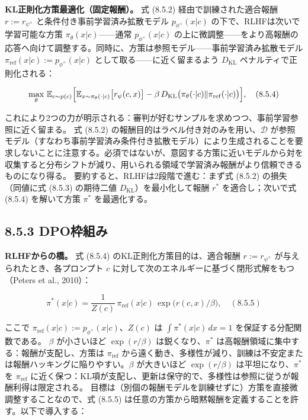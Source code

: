 \textbf{KL正則化方策最適化（固定報酬）。} 式 (8.5.2) 経由で訓練された適合報酬 $r:=r_{\psi^\times}$ と条件付き事前学習済み拡散モデル $p_{\phi^\times}(x|c)$ の下で、RLHFは次いで学習可能な方策 $\pi_\theta(x|c)$——通常 $p_{\phi^\times}(x|c)$ の上に微調整——をより高報酬の応答へ向けて調整する。同時に、方策は参照モデル——事前学習済み拡散モデル $\pi_{\mathrm{ref}}(x|c):=p_{\phi^\times}(x|c)$ として取る——に近く留まるよう $D_{\mathrm{KL}}$ ペナルティで正則化される：

\[
\max_\theta\,\mathbb{E}_{c\sim p(c)}\Bigl[\mathbb{E}_{x\sim\pi_\theta(\cdot|c)}\bigl[r_\psi(c,x)\bigr]-\beta\,D_{\mathrm{KL}}\bigl(\pi_\theta(\cdot|c)\|\pi_{\mathrm{ref}}(\cdot|c)\bigr)\Bigr], \quad (8.5.4)
\]


これにより2つの力が明示される：審判が好むサンプルを求めつつ、事前学習参照に近く留まる。
式 (8.5.2) の報酬目的はラベル付き対のみを用い、$\mathcal{D}$ が参照モデル（すなわち事前学習済み条件付き拡散モデル）により生成されることを要求しないことに注意する。必須ではないが、意図する方策に近いモデルから対を収集すると分布シフトが減り、用いられる領域で学習済み報酬がより信頼できるものになり得る。
要約すると、RLHFは2段階で進む：まず式 (8.5.2) の損失（同値に式 (8.5.3) の期待二値 $D_{\mathrm{KL}}$）を最小化して報酬 $r^*$ を適合し；次いで式 (8.5.4) を解いて方策 $\pi^*$ を最適化する。

\subsection*{8.5.3 DPO枠組み}


\textbf{RLHFからの橋。} 式 (8.5.4) のKL正則化方策目的は、適合報酬 $r:=r_{\psi^\times}$ が与えられたとき、各プロンプト $c$ に対して次のエネルギーに基づく閉形式解をもつ（Peters et al., 2010）：

\[
\pi^*(x|c)=\frac{1}{Z(c)}\,\pi_{\mathrm{ref}}(x|c)\,\exp\bigl(r(c,x)/\beta\bigr), \quad (8.5.5)
\]


ここで $\pi_{\mathrm{ref}}(x|c):=p_{\phi^\times}(x|c)$、$Z(c)$ は $\int\pi^*(x|c)\,dx=1$ を保証する分配関数である。
$\beta$ が小さいほど $\exp(r/\beta)$ は鋭くなり、$\pi^*$ は高報酬領域に集中する：報酬が支配し、方策は $\pi_{\mathrm{ref}}$ から遠く動き、多様性が減り、訓練は不安定または報酬ハッキングに陥りやすい。$\beta$ が大きいほど $\exp(r/\beta)$ は平坦になり、$\pi^*$ を $\pi_{\mathrm{ref}}$ に近く保つ：KL項が支配し、更新は保守的で、多様性は参照に従うが報酬利得は限定される。
目標は（別個の報酬モデルを訓練せずに）方策を直接微調整することなので、式 (8.5.5) は任意の方策から暗黙報酬を定義することを許す。以下で導入する：

